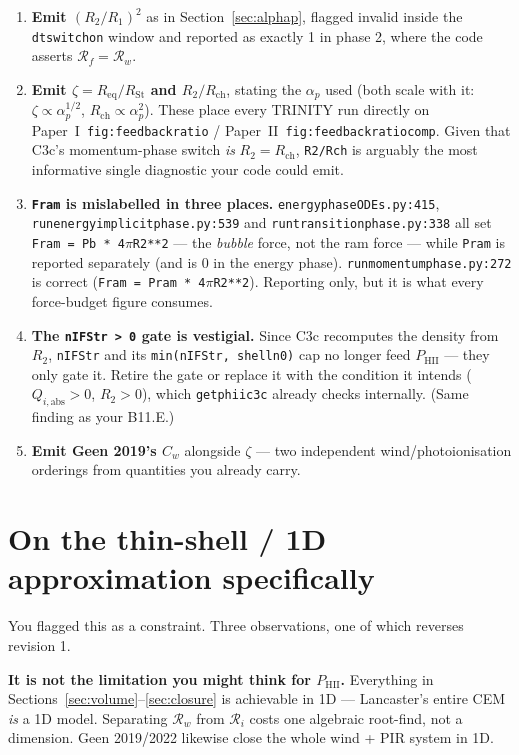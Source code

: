 \documentclass[11pt,a4paper,oneside]{report}
\newcommand{\brkus}{\textunderscore\allowbreak}
\newcommand{\code}[1]{\texttt{\small\let\_\brkus #1}}
\newcommand{\lbl}[1]{\texttt{\footnotesize\let\_\brkus #1}}
\newcommand{\PI}{Paper~I}
\newcommand{\PII}{Paper~II}
\newcommand{\Rw}{\mathcal{R}_{w}}
\newcommand{\Ri}{\mathcal{R}_{i}}
\newcommand{\Rf}{\mathcal{R}_{f}}
\newcommand{\Rch}{R_{\mathrm{ch}}}
\newcommand{\Req}{R_{\mathrm{eq}}}
\newcommand{\RSt}{R_{\mathrm{St}}}
\newcommand{\ap}{\alpha_p}
\newcommand{\PHII}{P_{\mathrm{HII}}}
\begin{document}
\begin{enumerate}
\item \textbf{Emit $(R_2/R_1)^2$} as in Section~\ref{sec:alphap}, flagged invalid inside the
      \code{dt\_switchon} window and reported as exactly 1 in phase 2, where the code asserts
      $\Rf=\Rw$.
\item \textbf{Emit $\zeta=\Req/\RSt$ and $R_2/\Rch$}, stating the $\ap$ used (both scale with
      it: $\zeta\propto\ap^{1/2}$, $\Rch\propto\ap^2$). These place every TRINITY run
      directly on \PI\ \lbl{fig:feedback\_ratio} / \PII\ \lbl{fig:feedback\_ratio\_comp}.
      Given that C3c's momentum-phase switch \emph{is} $R_2=\Rch$, \code{R2/Rch} is arguably
      the most informative single diagnostic your code could emit.
\item \textbf{\code{F\_ram} is mislabelled in three places.} \code{energy\_phase\_ODEs.py:415},
      \code{run\_energy\_implicit\_phase.py:539} and \code{run\_transition\_phase.py:338} all
      set \code{F\_ram = Pb * 4$\pi$R2**2} --- the \emph{bubble} force, not the ram force ---
      while \code{P\_ram} is reported separately (and is 0 in the energy phase).
      \code{run\_momentum\_phase.py:272} is correct (\code{F\_ram = P\_ram * 4$\pi$R2**2}).
      Reporting only, but it is what every force-budget figure consumes.
\item \textbf{The \code{n\_IF\_Str > 0} gate is vestigial.} Since C3c recomputes the density
      from $R_2$, \code{n\_IF\_Str} and its \code{min(n\_IF\_Str, shell\_n0)} cap no longer
      feed $\PHII$ --- they only gate it. Retire the gate or replace it with the condition it
      intends ($Q_{i,\mathrm{abs}}>0$, $R_2>0$), which \code{get\_phii\_c3c} already checks
      internally. (Same finding as your B11.E.)
\item \textbf{Emit Geen 2019's $C_w$} alongside $\zeta$ --- two independent
      wind/photoionisation orderings from quantities you already carry.
\end{enumerate}

\section{On the thin-shell / 1D approximation specifically}
\label{sec:thin}

You flagged this as a constraint. Three observations, one of which reverses revision 1.

\medskip
\textbf{It is not the limitation you might think for $\PHII$.} Everything in
Sections~\ref{sec:volume}--\ref{sec:closure} is achievable in 1D --- Lancaster's entire CEM
\emph{is} a 1D model. Separating $\Rw$ from $\Ri$ costs one algebraic root-find, not a
dimension. Geen 2019/2022 likewise close the whole wind + PIR system in 1D.
\end{document}
